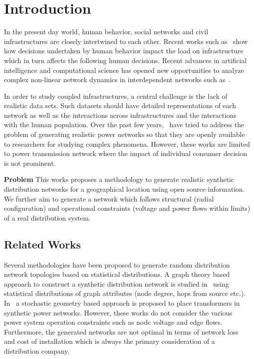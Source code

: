 \documentclass[sigconf]{acmart}
\begin{document}
\maketitle

\section{Introduction}\label{sec:intro}
In the present day world, human behavior, social networks and civil infrastructures are closely intertwined to each other. Recent works such as~\cite{Zeng2019,Duan2019} show how decisions undertaken by human behavior impact the load on infrastructure which in turn affects the following human decisions. Recent advances in artificial intelligence and computational science has opened new opportunities to analyze complex non-linear network dynamics in interdependent networks such as~\cite{Adiga_2020}.

In order to study coupled infrastructures, a central challenge is the lack of realistic data sets. Such datasets should have detailed representations of each network as well as the interactions across infrastructures and the interactions
with the human population. Over the past few years,~\cite{overbye_101,overbye_102,overbye_2019} have tried to address the problem of generating realistic power networks so that they are openly available to researchers for studying complex phenomena. However, these works are limited to power transmission network where the impact of individual consumer decision is not prominent. 

\noindent\textbf{Problem} This works proposes a methodology to generate realistic synthetic distribution networks for a geographical location using open source information. We further aim to generate a network which follows structural (radial configuration) and operational constraints (voltage and power flows within limits) of a real distribution system.

\subsection{Related Works}\label{ssec:related}
Several methodologies have been proposed to generate random distribution network topologies based on statistical distributions. A graph theory based approach to construct a synthetic distribution network is studied in~\cite{schweitzer} using statistical distributions of graph attributes (node degree, hops from source etc.). In~\cite{overbye_2019} a stochastic geometry based approach is proposed to place transformers in synthetic power networks. However, these works do not consider the various power system operation constraints such as node voltage and edge flows. Furthermore, the generated networks are not optimal in terms of network loss and cost of installation which is always the primary consideration of a distribution company. 
\end{document}

